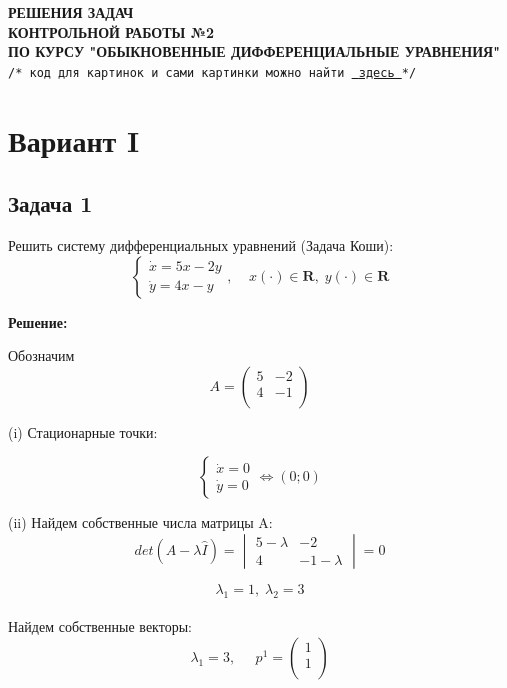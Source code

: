 \documentclass[a4paper, 12pt]{article}
\begin{document}
\begin{center}








\textbf{РЕШЕНИЯ ЗАДАЧ \\[3mm]
КОНТРОЛЬНОЙ РАБОТЫ №2\\[3mm]
ПО КУРСУ "ОБЫКНОВЕННЫЕ ДИФФЕРЕНЦИАЛЬНЫЕ УРАВНЕНИЯ"}\\[3mm]
\texttt{/* код для картинок и сами картинки можно найти  \href{https://github.com/pholeque/ode/blob/main/phase-portrait-of-linear-system.ipynb}{\color{BrickRed} {здесь }}*/}
\end{center}

	\section*{Вариант I}
		\subsection* {Задача 1}


 Решить систему дифференциальных уравнений (Задача Коши): 
\begin{equation}
\left\{
\begin{array}{lr}
\dot{x} = 5x-2y\\
\dot{y} = 4x-y
\end{array}
\right.
, \;\;\;\; x(\cdot)\in \textbf{R},\; y(\cdot)\in \textbf{R}
\label{eq:1}
\end{equation}

\textbf{Решение:} \par
Обозначим 
\[
A = \left(
\begin{array}{cc}
5 & -2\\
4 & -1\\
\end{array}
\right)\]

(i) Стационарные точки:

\[
\left\{
\begin{array}{lr}
\dot{x} = 0\\
\dot{y} = 0
\end{array}
\right.
\Leftrightarrow (0;0)
\]


(ii) Найдем собственные числа матрицы A:
\[det(A-\lambda \hat{I})=
\begin{vmatrix}
5-\lambda & -2 \\
4 & -1-\lambda
\end{vmatrix}
=0\]

\[\lambda_1=1, \; \lambda_2=3\]
\\Найдем собственные векторы:
\[\lambda_1=3,\;\;\;\;\; p^1=
\left(
\begin{array}{cc}
1\\
1\\
\end{array}
\right)
\]
\end{document}

